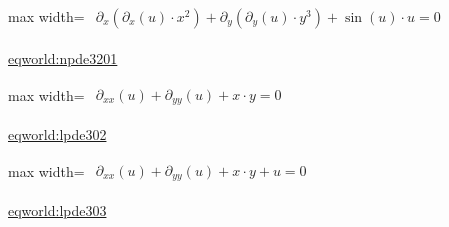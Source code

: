 \documentclass[10pt,a4paper]{article}
\begin{document}
\begin{minipage}{\linewidth}
\begin{center}\begin{adjustbox}{max width=\linewidth}$\displaystyle\begin{gathered}\begin{gathered}\partial_{x}(\partial_{x}(u)\cdot x^{2})+\partial_{y}(\partial_{y}(u)\cdot y^{3})+\sin(u)\cdot u=0\end{gathered}\end{gathered}$\end{adjustbox}\end{center}
{\small \href{https://eqworld.ipmnet.ru/en/solutions/npde/npde3201.pdf}{eqworld:npde3201}}\par
\end{minipage}\par\vspace{7mm}

\begin{minipage}{\linewidth}
\begin{center}\begin{adjustbox}{max width=\linewidth}$\displaystyle\begin{gathered}\begin{gathered}\partial_{xx}(u)+\partial_{yy}(u)+x\cdot y=0\end{gathered}\end{gathered}$\end{adjustbox}\end{center}
{\small \href{https://eqworld.ipmnet.ru/en/solutions/lpde/lpde302.pdf}{eqworld:lpde302}}\par
\end{minipage}\par\vspace{7mm}

\begin{minipage}{\linewidth}
\begin{center}\begin{adjustbox}{max width=\linewidth}$\displaystyle\begin{gathered}\begin{gathered}\partial_{xx}(u)+\partial_{yy}(u)+x\cdot y+u=0\end{gathered}\end{gathered}$\end{adjustbox}\end{center}
{\small \href{https://eqworld.ipmnet.ru/en/solutions/lpde/lpde303.pdf}{eqworld:lpde303}}\par
\end{minipage}\par\vspace{7mm}
\end{document}
